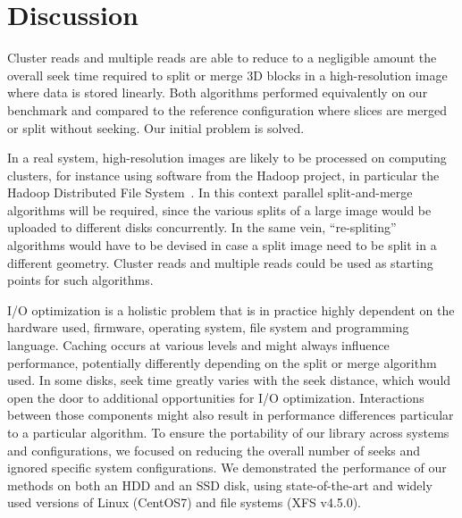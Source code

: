 \documentclass[10pt, conference, compsocconf]{IEEEtran}
\begin{document}
\newpage

\section{Discussion}
\label{sec:discussion}

Cluster reads and multiple reads are able to reduce to a negligible
amount the overall seek time required to split or merge 3D blocks in a
high-resolution image where data is stored linearly. Both algorithms
performed equivalently on our benchmark and compared to the reference
configuration where slices are merged or split without seeking. Our
initial problem is solved.

In a real system, high-resolution images are likely to be processed on
computing clusters, for instance using software from the Hadoop
project, in particular the Hadoop Distributed File
System~\cite{shvachko2010hadoop}. In this context parallel split-and-merge algorithms
will be required, since the various splits of a large image would be
uploaded to different disks concurrently. In the same vein,
``re-spliting'' algorithms would have to be devised in case a split
image need to be split in a different geometry. Cluster reads and
multiple reads could be used as starting points for such algorithms.

I/O optimization is a holistic problem that is in practice highly
dependent on the hardware used, firmware, operating system, file
system and programming language. Caching occurs at various levels and
might always influence performance, potentially differently depending
on the split or merge algorithm used. In some disks, seek time greatly
varies with the seek distance, which would open the door to additional
opportunities for I/O optimization. Interactions between those
components might also result in performance differences particular to
a particular algorithm. To ensure the portability of our library
across systems and configurations, we focused on reducing the overall
number of seeks and ignored specific system configurations. We
demonstrated the performance of our methods on both an HDD and an SSD
disk, using state-of-the-art and widely used versions of Linux
(CentOS7) and file systems (XFS v4.5.0).
\end{document}
